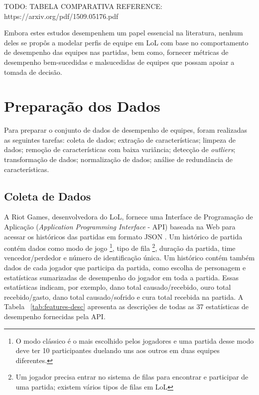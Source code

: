 TODO: TABELA COMPARATIVA
REFERENCE: https://arxiv.org/pdf/1509.05176.pdf

Embora estes estudos desempenhem um papel essencial na literatura, nenhum deles se propôs a modelar perfis de equipe em LoL com base no comportamento de desempenho das equipes nas partidas, bem como, fornecer métricas de desempenho bem-sucedidas e malsucedidas de equipes que possam apoiar a tomada de decisão.

\chapter{Preparação dos Dados}
Para preparar o conjunto de dados de desempenho de equipes, foram realizadas as seguintes tarefas: coleta de dados; extração de características; limpeza de dados; remoção de características com baixa variância; detecção de \textit{outliers}; transformação de dados; normalização de dados; análise de redundância de características.

\section{Coleta de Dados}
A Riot Games, desenvolvedora do LoL, fornece uma Interface de Programação de Aplicação (\textit{Application Programming Interface} - API) baseada na Web para acessar os históricos das partidas em formato JSON \cite{riot1}. Um histórico de partida contém dados como modo de jogo \footnote{O modo clássico é o mais escolhido pelos jogadores e uma partida desse modo deve ter 10 participantes duelando uns aos outros em duas equipes diferentes.}, tipo de fila \footnote{Um jogador precisa entrar no sistema de filas para encontrar e participar de uma partida; existem vários tipos de filas em LoL}, duração da partida, time vencedor/perdedor e número de identificação única. Um histórico contém também dados de cada jogador que participa da partida, como escolha de personagem e estatísticas sumarizadas de desempenho do jogador em toda a partida. Essas estatísticas indicam, por exemplo, dano total causado/recebido, ouro total recebido/gasto, dano total causado/sofrido e cura total recebida na partida. A Tabela ~\ref{tab:features-desc} apresenta as descrições de todas as 37 estatísticas de desempenho fornecidas pela API.

